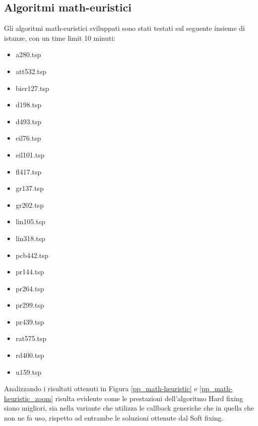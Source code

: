 \vspace{2cm}
\subsection{Algoritmi math-euristici}
Gli algoritmi math-euristici sviluppati sono stati testati sul seguente insieme di istanze, con un time limit 10 minuti:
\begin{center}
\begin{multicols}{3}
\begin{itemize}
\item{a280.tsp}  
\item{att532.tsp} 
\item{bier127.tsp}
\item{d198.tsp}   
\item{d493.tsp}   
\item{eil76.tsp}  
\item{eil101.tsp} 
\item{fl417.tsp}  
\item{gr137.tsp}  
\item{gr202.tsp}  
\item{lin105.tsp} 
\item{lin318.tsp} 
\item{pcb442.tsp} 
\item{pr144.tsp}  
\item{pr264.tsp}  
\item{pr299.tsp}  
\item{pr439.tsp}  
\item{rat575.tsp} 
\item{rd400.tsp}  
\item{u159.tsp}
\end{itemize}
\end{multicols}
\end{center}
Analizzando i risultati ottenuti in Figura \ref{pp_math-heuristic} e \ref{pp_math-heuristic_zoom} risulta evidente come le prestazioni dell'algoritmo Hard fixing siano migliori, sia nella variante che utilizza le callback generiche che in quella che non ne fa uso, rispetto ad entrambe le soluzioni ottenute dal Soft fixing.
